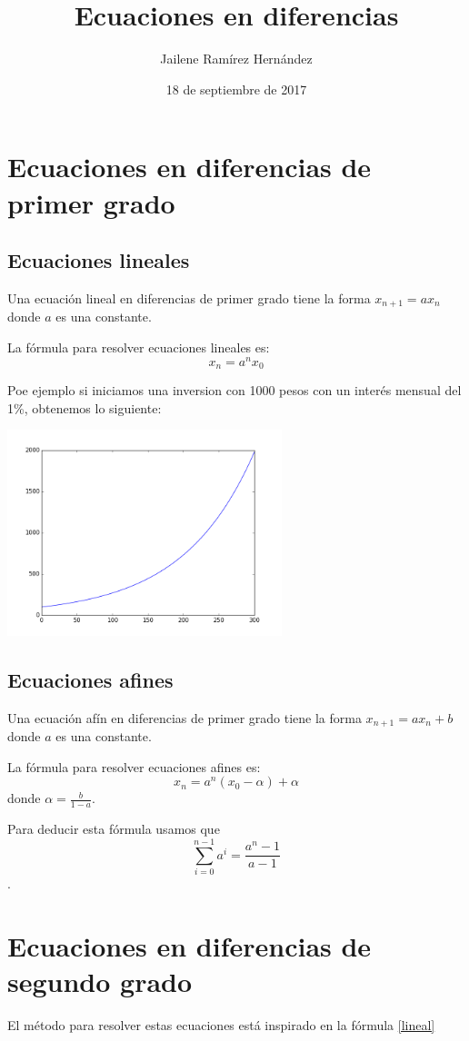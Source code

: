 \documentclass{article}
\title{Ecuaciones en diferencias}
\author{Jailene Ramírez Hernández}
\date{18 de septiembre de 2017}
\begin{document}
\maketitle

\section{Ecuaciones en diferencias de primer grado}

\subsection{Ecuaciones lineales}

Una ecuación lineal en diferencias de primer grado tiene la forma $x_{n+1}=ax_n$ donde $a$ es una constante.

La fórmula para resolver ecuaciones lineales es:
\begin{equation}
  \label{lineal}
  x_n=a^nx_0
\end{equation}

Poe ejemplo si iniciamos una inversion con 1000 pesos con un interés mensual del 1\%, obtenemos lo siguiente:

\begin{center}
  \includegraphics[width=8cm]{inversion.png}
\end{center}


\subsection{Ecuaciones afines}

Una ecuación afín en diferencias de primer grado tiene la forma $x_{n+1}=ax_n+b$ donde $a$ es una constante.

La fórmula para resolver ecuaciones afines es:
\begin{equation}
  \label{afin}
  x_n=a^n(x_0-\alpha)+\alpha
\end{equation}
donde $\alpha=\frac{b}{1-a}$.

Para deducir esta fórmula usamos que $$\sum_{i=0}^{n-1}a^i=\frac{a^n-1}{a-1}$$.

\section{Ecuaciones en diferencias de segundo grado}

El método para resolver estas ecuaciones está inspirado en la fórmula \ref{lineal}
\end{document}
